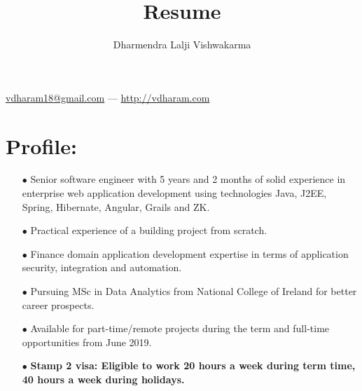 \documentclass{article}
\makeatletter
\renewcommand{\maketitle}{
\begin{center}
{\LARGE\bfseries
\theauthor}

\vspace{0.25em}
\href{mailto:vdharam18@gmail.com}{vdharam18@gmail.com} --- \href{http://vdharam.com}{http://vdharam.com}
\end{center}	
}
\makeatother
\begin{document}
\title{Resume}
\author{Dharmendra Lalji Vishwakarma}
\maketitle

\section{Profile:}
\begin{itemize}
\itemsep0em
\item[$\bullet$]
Senior software engineer with 5 years and 2 months of solid experience in enterprise web application development using technologies Java, J2EE, Spring, Hibernate, Angular, Grails and ZK.
\item[$\bullet$]
Practical experience of a building project from scratch.
\item[$\bullet$]
Finance domain application development expertise in terms of application security, integration and automation.
\item[$\bullet$]
Pursuing MSc in Data Analytics from National College of Ireland for better career prospects.
\item[$\bullet$]
Available for part-time/remote projects during the term and full-time opportunities from June 2019.
\item[$\bullet$]
\bfseries
Stamp 2 visa: Eligible to work 20 hours a week during term time, 40 hours a week during holidays.
\end{itemize}
\end{document}
